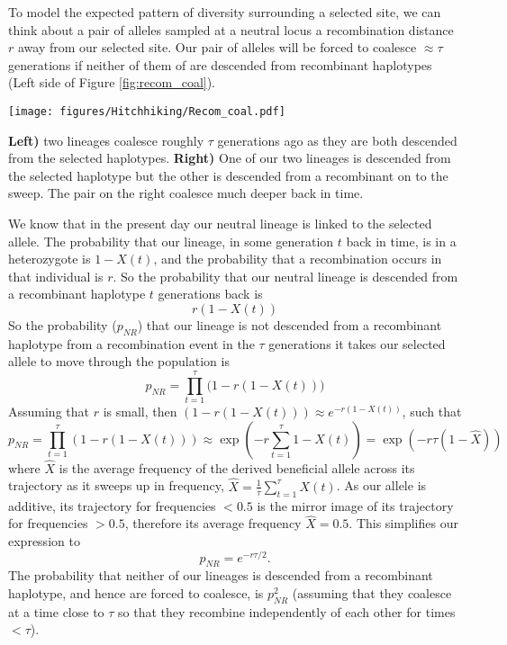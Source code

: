 To model the expected pattern of diversity surrounding a selected site, we can think about a pair
of alleles sampled at a neutral locus a recombination distance $r$
away from our selected site. Our pair of alleles will be forced to
coalesce $\approx \tau$ generations if neither of them of are
descended from recombinant haplotypes (Left side of Figure \ref{fig:recom_coal}).\\
\begin{marginfigure}
\begin{center}
\texttt{[image: figures/Hitchhiking/Recom\_coal.pdf]}
\end{center}
\caption{{\bf Left)} two lineages coalesce roughly $\tau$ generations
  ago as they are both descended from the selected haplotypes. {\bf Right)}
One of our two lineages is descended from the selected haplotype but
the other is descended from a recombinant on to the sweep. The pair on
the right coalesce much deeper back in time.} \label{fig:recom_coal}
\end{marginfigure}
We know that in the present day our neutral lineage is linked to
the selected allele. The probability that our lineage, in some
generation $t$ back in time, is in a heterozygote is $1-X(t)$, and the
probability that a recombination occurs in that individual is $r$. So
the probability that our neutral lineage is descended from a
recombinant haplotype $t$ generations back is 
\begin{equation}
r (1-X(t))
\end{equation}
So the probability ($p_{NR}$) that our lineage is not descended from a
recombinant haplotype 
from a recombination event in the
$\tau$ generations it takes our selected allele to move through the
population is
\begin{equation}
p_{NR}=\prod_{t=1}^{\tau} \big(1- r(1-X(t))\big)
\end{equation}
Assuming that $r$ is small, then $ \left(1- r(1-X(t))\right) \approx
e^{-r(1-X(t))}$,  such that
\begin{equation}
p_{NR}=\prod_{t=1}^{\tau} \left(1- r(1-X(t))\right) \approx \exp
\left( -r\sum_{t=1}^{\tau}
1- X(t) \right) =\exp
\left( -r \tau (1-\widehat{X}) \right)
\end{equation}
where
$\widehat{X}$ is the average frequency of the derived beneficial allele across its trajectory as it sweeps up in frequency,
$\widehat{X} = \frac{1}{\tau}  \sum_{t=1}^{\tau}
 X(t)$. As our allele is additive, its trajectory for frequencies
 $<0.5$ is the mirror image of its trajectory for frequencies $>0.5$, therefore its
average frequency $\widehat{X} =0.5$. This simplifies our expression to
\begin{equation}
p_{NR} = e^{-r \tau/2 }.
\end{equation}
The probability that neither of our lineages is descended from a
recombinant haplotype, and hence are forced to coalesce, is $p_{NR}^2$ (assuming that
they coalesce at a time close to $\tau$ so that they recombine
independently of each other for times $< \tau$).\\

